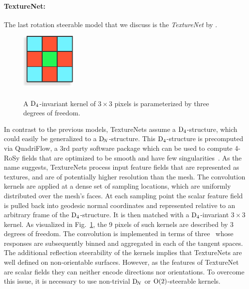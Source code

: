 \paragraph{TextureNet:}
The last rotation steerable model that we discuss is the \emph{TextureNet} by \citet{huang2019texturenet}.
\begin{figure}
    \centering
    \includegraphics[width=.16\textwidth]{figures/3x3_D4_invariant_kernel.pdf}
    \captionsetup{width=.21\textwidth}
    \caption{\small
        \\
        A $\operatorname{D}_{4}$-invariant kernel of $3\times3$ pixels is parameterized by three degrees of freedom.
        }
    \label{fig:3x3_D4_invariant_kernel}
\end{figure}%
In contrast to the previous models, TextureNets assume a $\operatorname{D}_{4}$-structure, which could easily be generalized to a $\operatorname{D}_{\!N}$-structure.
This $\operatorname{D}_{4}$-structure is precomputed via QuadriFlow, a 3rd party software package which can be used to compute 4-RoSy fields that are optimized to be smooth and have few singularities~\cite{Huang2018QuadriFlow}.
As the name suggests, TextureNets process input feature fields that are represented as textures, and are of potentially higher resolution than the mesh.
The convolution kernels are applied at a dense set of sampling locations, which are uniformly distributed over the mesh's faces.
At each sampling point the scalar feature field is pulled back into geodesic normal coordinates and represented relative to an arbitrary frame of the $\operatorname{D}_{4}$-structure.
It is then matched with a $\operatorname{D}_{4}$-invariant $3\times3$ kernel.
As visualized in Fig.~\ref{fig:3x3_D4_invariant_kernel}, the 9 pixels of such kernels are described by 3 degrees of freedom.
The convolution is implemented in terms of three \onexones\ whose responses are subsequently binned and aggregated in each of the tangent spaces.
The additional reflection steerability of the kernels implies that TextureNets are well defined on non-orientable surfaces.
However, as the features of TextureNet are scalar fields they can neither encode directions nor orientations.
To overcome this issue, it is necessary to use non-trivial $\operatorname{D}_{\!N}$ or $\operatorname{O}(2)$-steerable kernels.
